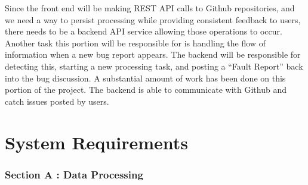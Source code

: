 \documentclass[12pt]{article}
\begin{document}
Since the front end will be making REST API calls to Github
repositories, and we need a way to persist processing while providing
consistent feedback to users, there needs to be a backend API service
allowing those operations to occur. Another task this portion will be
responsible for is handling the flow of information when a new bug
report appears. The backend will be responsible for detecting this,
starting a new processing task, and posting a ``Fault Report'' back into
the bug discussion. A substantial amount of work has been done on this
portion of the project. The backend is able to communicate with Github
and catch issues posted by users.

\hypertarget{system-requirements}{%
\section{System Requirements}\label{system-requirements}}

\hypertarget{section-a-data-processing}{%
\subsubsection{Section A : Data
Processing}\label{section-a-data-processing}}
\end{document}
